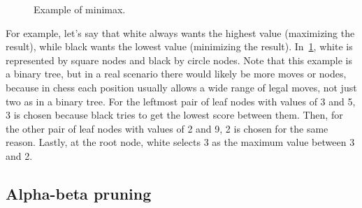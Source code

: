 \begin{figure}[H]
    \centering
    \caption{Example of minimax.}\label{fig:minimax}
\end{figure}

\noindent For example, let's say that white always wants the highest value (maximizing the result), while black wants the lowest value (minimizing the result). In~\cref{fig:minimax}, white is represented by square nodes and black by circle nodes. Note that this example is a binary tree, but in a real scenario there would likely be more moves or nodes, because in chess each position usually allows a wide range of legal moves, not just two as in a binary tree. For the leftmost pair of leaf nodes with values of 3 and 5, 3 is chosen because black tries to get the lowest score between them. Then, for the other pair of leaf nodes with values of 2 and 9, 2 is chosen for the same reason. Lastly, at the root node, white selects 3 as the maximum value between 3 and 2.

\vspace{1em}

\subsection*{Alpha-beta pruning}\label{sec:alphaBeta}

